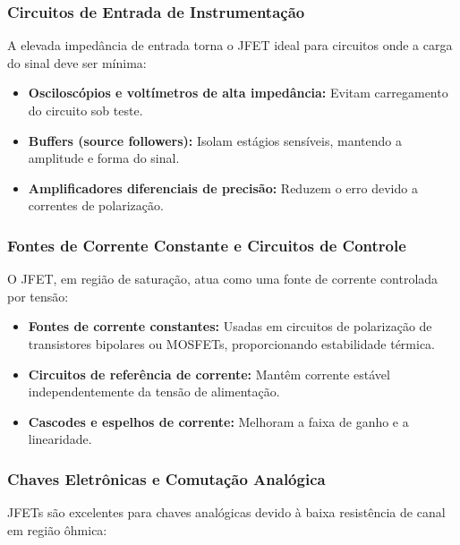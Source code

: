 \documentclass[12pt]{article}
\begin{document}
\subsubsection{Circuitos de Entrada de Instrumentação}

A elevada impedância de entrada torna o JFET ideal para circuitos onde a carga do sinal deve ser mínima:

\begin{itemize}
    \item \textbf{Osciloscópios e voltímetros de alta impedância:} Evitam carregamento do circuito sob teste.

    \item \textbf{Buffers (source followers):} Isolam estágios sensíveis, mantendo a amplitude e forma do sinal.

    \item \textbf{Amplificadores diferenciais de precisão:} Reduzem o erro devido a correntes de polarização.
\end{itemize}

\subsubsection{Fontes de Corrente Constante e Circuitos de Controle}

O JFET, em região de saturação, atua como uma fonte de corrente controlada por tensão:

\begin{itemize}
    \item \textbf{Fontes de corrente constantes:} Usadas em circuitos de polarização de transistores bipolares ou MOSFETs, proporcionando estabilidade térmica.

    \item \textbf{Circuitos de referência de corrente:} Mantêm corrente estável independentemente da tensão de alimentação.

    \item \textbf{Cascodes e espelhos de corrente:} Melhoram a faixa de ganho e a linearidade.
\end{itemize}

\subsubsection{Chaves Eletrônicas e Comutação Analógica}

JFETs são excelentes para chaves analógicas devido à baixa resistência de canal em região ôhmica:
\end{document}
